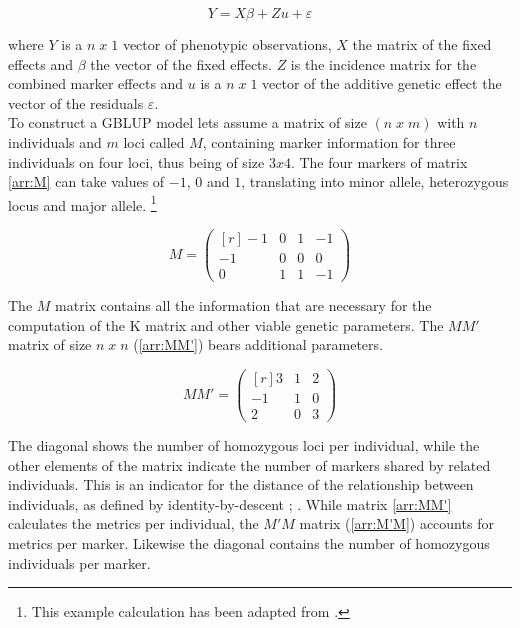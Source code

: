 \begin{equation}
Y = X \beta + Zu + \varepsilon
 \label{eqn:blup}
\end{equation}

where $Y$ is a $n\;x\;1$ vector of phenotypic observations, $X$ the matrix of the fixed
effects and $\beta$ the vector of the fixed effects. $Z$ is the incidence matrix for the
combined marker effects and $u$ is a $n\; x\; 1$ vector of the additive genetic effect
the vector of the residuals $\varepsilon$.\\
To construct a GBLUP model lets assume a matrix of size $(n\; x\; m)$ with $n$ individuals
and $m$ loci called $M$, containing marker information for three individuals on four loci,
thus being of size $3x4$. The four markers of matrix \ref{arr:M} can take values of $-1$,
$0$ and $1$, translating into minor allele, heterozygous locus and major
allele. \footnote{This example calculation has been adapted from \cite{isik2013}.}

\begin{equation}
 M = 
 \begin{pmatrix}[r]
  -1 & 0 & 1 & -1 \\
  -1 & 0 & 0 & 0 \\
   0 & 1 & 1 & -1 
 \end{pmatrix}
 \label{arr:M}
\end{equation}

The $M$ matrix contains all the information that are necessary for the computation of the K matrix and other viable genetic parameters. The $MM'$ matrix of size $n\; x\; n$ (\ref{arr:MM'}) bears additional parameters.

\begin{equation}
 MM' = 
 \begin{pmatrix}[r]
  3 & 1 & 2 \\
  -1 & 1 & 0 \\
  2 & 0 & 3 
 \end{pmatrix}
 \label{arr:MM'}
\end{equation}

The diagonal shows the number of homozygous loci per individual, while the other elements
of the matrix indicate the number of markers shared by related individuals. This is an
indicator for the distance of the relationship between individuals, as defined by
identity-by-descent \cite{vanraden2008efficient}; \cite{misztal2013methods}. While matrix
\ref{arr:MM'} calculates the metrics per individual, the $M'M$ matrix (\ref{arr:M'M})
accounts for metrics per marker. Likewise the diagonal contains the number of homozygous
individuals per marker.

